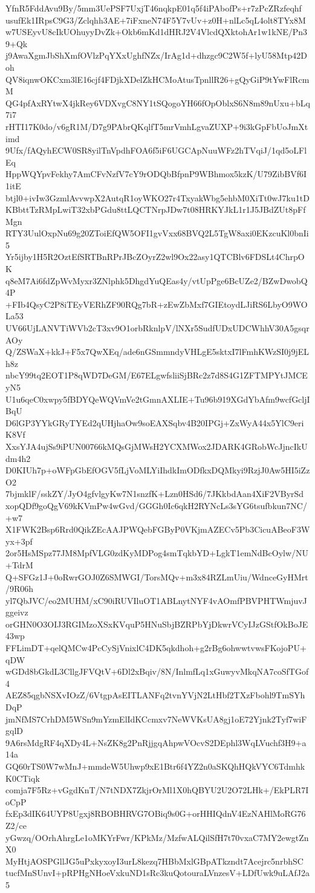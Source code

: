 YfnR5FddAvu9By/5mm3UePSF7UxjT46nqkpE01q5f4iPAbofPs+r7zPcZRzfeqhf
usufEk1IRpsC9G3/Zclqhh3AE+7iFxneN74F5Y7vUv+z0H+nlLc5qL4olt8TYx8M
w7USEyvU8cIkUOhuyyDvZk+Okb6mKd1dHRJ2V4VlcdQXktohAr1w1kNE/Pn39+Qk
j9AwaXgmJbShXmfOVlzPqYXxUghfNZx/IrAg1d+dhzgc9C2W5f+lyU58Mtp42Doh
QV8iqnwOKCxm3lE16cjf4FDjkXDelZkHCMoAtusTpnllR26+gQyGiP9tYwFlRcmM
QG4pfAxRYtwX4jkRey6VDXvgC8NY1tSQogoYH66fOpOblxS6N8m89nUxu+bLq7i7
rHTI17K0do/v6gR1M/D7g9PAbrQKqlfT5mrVmhLgvaZUXP+9i3kGpFbUoJmXtimd
9Ufx/fAQyhECW0SR8yilTnVpdhFOA6f5iF6UGCApNuuWFz2hTVqiJ/1qd5oLFlEq
HppWQYpvFekhy7AmCFvNzfV7cY9rODQbBfpnP9WBhmox5kzK/U79ZibBVf6I1itE
btjl0+ivIw3GzmlAvvwpX2AutqR1oyWKO27r4TxyakWbg5ehbM0XiTt0wJ7ku1tD
KBbttTzRMpLwiT32xbPGdu8ttLQCTNrpJDw7t08HRKYJkL1r1J5JBdZUt8pFfMgn
RTY3UulOxpNu69g20ZToiEfQW5OFI1gvVxx68BVQ2L5TgW8axi0EKzcuKl0bnIi5
Yr5ijby1H5R2OztEfSRTBnRPrJBcZOyrZ2wl9Ox22asy1QTCBlv6FDSLt4ChrpOK
q8eM7Ai6fdZpWvMyxr3ZNlphk5DhgdYuQEas4y/vtUpPge6BcUZe2/BZwDwobQ4P
+FIb4QsyC2P8iTEyVERhZF90RQg7bR+zEwZbMxf7GIEtoydLJiRS6LbyO9WOLa53
UV66UjLANVTiWVb2cT3xv9O1orbRknlpV/lNXr5SudfUDxUDCWhhV30A5gsqrAOy
Q/ZSWaX+kkJ+F5x7QwXEq/ade6nGSmmndyVHLgE5sktxI7lFmhKWzSI0j9jELh8z
nbcY99tq2EOT1P8qWD7DeGM/E67ELgwfsliiSjBRc2z7d8S4G1ZFTMPYtJMCEyN5
U1u6qeC0xwpy5fBDYQeWQVmVe2tGmnAXLIE+Tu96b919XGdYbAfm9wcfGcljIBqU
D6lGP3YYkGRyTYEd2qUHjhaOw9soEAXSqbv4B20IPGj+ZxWyA44x5YlC9eriK8Vf
XxsYJA4ujSs9iPUN00766kMQsGjMWsH2YCXMWox2JDARK4GRobWcJjncIkUdm4h2
D0KIUh7p+oWFpGbEfOGV5fLjVoMLYiIhdkImODfkxDQMkyi9RzjJ0Aw5HI5iZzO2
7bjmklF/sskZY/JyO4gfvlgyKw7N1snzfK+Lzn0HSd6/7JKkbdAan4XiF2VByrSd
xopQDf9goQgV69kKVmPw4wGvd/GGGh0Ic6qkH2RYNcLs3sYG6tsufbkun7NC/+w7
X1FWK2Bsp6Rrd0QikZEcAAJPWQebFGByP0VKjmAZECv5Pb3CicuABeoF3Wyx+3pf
2or5HsMSpz77JM8MpfVLG0zdKyMDPog4smTqkbYD+LgkT1emNdBcOylw/NU+TdrM
Q+SFGz1J+0oRwrGOJ0Z6SMWGI/TorsMQv+m3x84RZLmUiu/WdnceGyHMrt/9R06h
yl7QbJVC/eo2MUHM/xC90iRUVIluOT1ABLnytNYF4vAOmfPBVPHTWmjuvJggeivz
orGHN0O3OIJ3RGIMzoXSxKVquP5HNuSbjBZRPbYjDkwrVCyIJzGStfOkBoJE43wp
FFLimDT+qelQMCw4PcCySjVnixlC4DK5qkdhoh+g2rBg6ohwwtvwsFKojoPU+qDW
wGDd8bGkdL3CllgJFVQtV+6Dl2xBqiv/8N/InlmfLq1xGuwyvMkqNA7coSfTGof4
AEZ85qgbNSXvIOzZ/6VtgpAsEITLANFq2tvnYVjN2LtHbf2TXzFbohl9TmSYhDqP
jmNfMS7CrhDM5WSn9mYzmElIdKCcmxv7NeWVKsUA8gj1oE72Yjnk2Tyf7wiFgqlD
9A6rsMdgRF4qXDy4L+NsZK8g2PnRjjgqAhpwVOcvS2DEphl3WqLVuchf3H9+a14a
GQ60rTS0W7wMnJ+mmdeW5Uhwp9xE1Btr6f4YZ2n0aSKQhHQkVYC6TdmhkK0CTiqk
comja7F5Rz+vGgdKnT/N7tNDX7ZkjrOrMl1X0hQBYU2U2O72LHk+/EkPLR7IoCpP
fxEp3dIK64UYP8Ugxj8RBOBHRVG7OBiq9s0G+orHHIQdnV4EzNAHlMoRG76Z2/ce
yGwzq/OOrhAhrgLe1oMKYrFwr/KPkMz/MzfwALQilSfH7t70vxaC7MY2ewgtZnX0
MyHtjAOSPGllJG5uPxkyxoyI3urL8kezq7HBbMxlGBpATkzndt7Acejrc5nrbhSC
tucfMnSUnvI+pRPHgNHoeVxkuND1sRc3kuQotouraLVnzesV+LDfUwk9uLAfJ2a5
